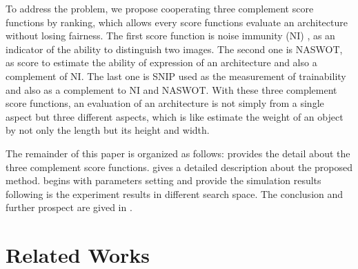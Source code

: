 \documentclass[sigconf]{acmart}
\begin{document}
    To address the problem, we propose cooperating three complement score 
    functions by ranking, which allows every score functions evaluate an 
    architecture without losing fairness. 
    The first score function is noise immunity (NI) \cite{10092788}, as 
    an indicator of the ability to distinguish two images. 
    The second one is NASWOT, as score to estimate the ability of expression 
    of an architecture and also a complement of NI. 
    The last one is SNIP used as the measurement of trainability and 
    also as a complement to NI and NASWOT. 
    With these three complement score functions, an evaluation of an 
    architecture is not simply from a single aspect but three different 
    aspects, which is like estimate the weight of an object by not only 
    the length but its height and width. 


    The remainder of this paper is organized as follows:  provides the 
    detail about the three complement score functions.  gives a detailed 
    description about the proposed method.  begins with parameters setting and 
    provide the simulation results following is the experiment results in different search space. 
    The conclusion and further prospect are gived in .

    \section{Related Works}
    \label{sec:related_work}
\end{document}
